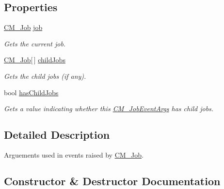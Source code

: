 \subsection*{Properties}
\begin{DoxyCompactItemize}
\item 
\hyperlink{class_c_m___job}{C\+M\+\_\+\+Job} \hyperlink{class_c_m___job_event_args_a602ecf7364ca2e6a2285f1622e7f1c8b}{job}
\begin{DoxyCompactList}\small\item\em Gets the current job. \end{DoxyCompactList}\item 
\hyperlink{class_c_m___job}{C\+M\+\_\+\+Job}\mbox{[}$\,$\mbox{]} \hyperlink{class_c_m___job_event_args_a6b20e99da0cb8807604b4459eebb4484}{child\+Jobs}
\begin{DoxyCompactList}\small\item\em Gets the child jobs (if any). \end{DoxyCompactList}\item 
bool \hyperlink{class_c_m___job_event_args_a67592931253f8d17df276bc17b54952b}{has\+Child\+Jobs}
\begin{DoxyCompactList}\small\item\em Gets a value indicating whether this \hyperlink{class_c_m___job_event_args}{C\+M\+\_\+\+Job\+Event\+Args} has child jobs. \end{DoxyCompactList}\end{DoxyCompactItemize}


\subsection{Detailed Description}
Arguements used in events raised by \hyperlink{class_c_m___job}{C\+M\+\_\+\+Job}. 



\subsection{Constructor \& Destructor Documentation}
\hypertarget{class_c_m___job_event_args_a31a12f7cf24666f25f6b0967668cff61}{}
